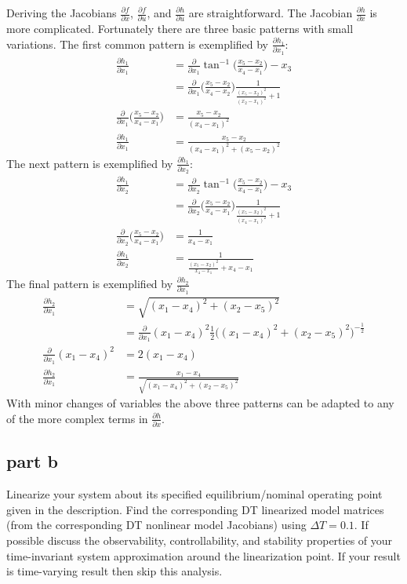 \documentclass[11pt]{article}
\begin{document}
Deriving the Jacobians $\frac{\partial f}{\partial x}$, $\frac{\partial f}{\partial u}$, and $\frac{\partial h}{\partial u}$ are straightforward. The Jacobian $\frac{\partial h}{\partial x}$ is more complicated. Fortunately there are three basic patterns with small variations. The first common pattern is exemplified by $\frac{\partial h_1}{\partial x_1}$:
\begin{align*}
    \frac{\partial h_1}{\partial x_1} &= \frac{\partial}{\partial x_1}\tan^{-1}\Bigg(\frac{x_5-x_2}{x_4-x_1}\Bigg)-x_3 \\
    &= \frac{\partial}{\partial x_1}\Bigg(\frac{x_5-x_2}{x_4-x_2}\Bigg) \frac{1}{\frac{(x_5-x_2)^2}{(x_2-x_1)^2}+1} \\
    \frac{\partial}{\partial x_1}\Bigg(\frac{x_5-x_2}{x_4-x_1}\Bigg) &= \frac{x_5-x_2}{(x_4-x_1)^2} \\
    \frac{\partial h_1}{\partial x_1} &= \frac{x_5-x_2}{(x_4-x_1)^2+(x_5-x_2)^2}
\end{align*}
The next pattern is exemplified by $\frac{\partial h_1}{\partial x_2}$:
\begin{align*}
    \frac{\partial h_1}{\partial x_2} &= \frac{\partial}{\partial x_2} \tan^{-1}\Bigg(\frac{x_5-x_2}{x_4-x_1}\Bigg) -x_3 \\
    &= \frac{\partial}{\partial x_2}\Bigg(\frac{x_5-x_2}{x_4-x_1}\Bigg)\frac{1}{\frac{(x_5-x_2)^2}{(x_4-x_1)^2}+1} \\
    \frac{\partial}{\partial x_2}\Bigg(\frac{x_5-x_2}{x_4-x_1}\Bigg) &= \frac{1}{x_4-x_1} \\
    \frac{\partial h_1}{\partial x_2} &= \frac{1}{\frac{(x_5-x_2)^2}{x_4-x_1}+x_4-x_1}
\end{align*}
The final pattern is exemplified by $\frac{\partial h_2}{\partial x_1}$
\begin{align*}
    \frac{\partial h_2}{\partial x_1} &= \sqrt{(x_1-x_4)^2+(x_2-x_5)^2} \\
    &= \frac{\partial}{\partial x_1}(x_1-x_4)^2 \frac{1}{2}\big((x_1-x_4)^2+(x_2-x_5)^2\big)^{-\frac{1}{2}} \\
    \frac{\partial}{\partial x_1}(x_1-x_4)^2 &= 2(x_1-x_4) \\
    \frac{\partial h_2}{\partial x_1} &= \frac{x_1-x_4}{\sqrt{(x_1-x_4)^2+(x_2-x_5)^2}}
\end{align*}
With minor changes of variables the above three patterns can be adapted to any of the more complex terms in $\frac{\partial h}{\partial x}$.

\subsection*{part b}
Linearize your system about its specified equilibrium/nominal operating point given in the description. Find the corresponding DT linearized model matrices (from the corresponding DT nonlinear model Jacobians) using $\Delta T = 0.1$. If possible discuss the observability, controllability, and stability properties of your time-invariant system approximation around the linearization point. If your result is time-varying result then skip this analysis.
\end{document}
